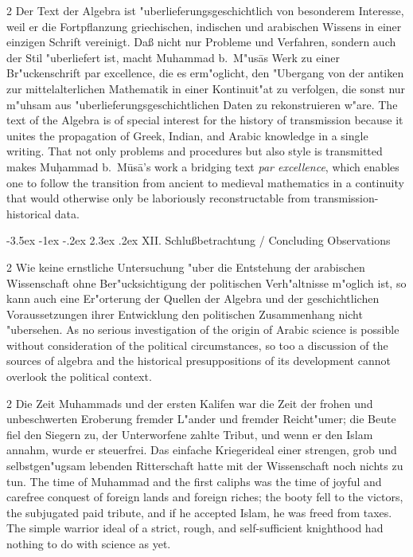 \documentclass[10pt,a4paper]{article}
\makeatletter
\renewcommand{\switchcolumn}{\syncronize\nointerlineskip\columnbreak}
\renewcommand{\section}{\@startsection{section}{1}{\z@}%
  {-3.5ex \@plus -1ex \@minus -.2ex}%
  {2.3ex \@plus .2ex}%
  {\normalfont\Large\bfseries\color{sectioncolor}}}
\makeatother
\begin{document}
\begin{paracol}{2}
Der Text der Algebra ist "uberlieferungsgeschichtlich von besonderem Interesse, weil er die Fortpflanzung griechischen, indischen und arabischen Wissens in einer einzigen Schrift vereinigt. Da\ss{} nicht nur Probleme und Verfahren, sondern auch der Stil "uberliefert ist, macht Muhammad b.\ M"us\=as Werk zu einer Br"uckenschrift par excellence, die es erm"oglicht, den "Ubergang von der antiken zur mittelalterlichen Mathematik in einer Kontinuit"at zu verfolgen, die sonst nur m"uhsam aus "uberlieferungsgeschichtlichen Daten zu rekonstruieren w"are.
\switchcolumn
The text of the Algebra is of special interest for the history of transmission because it unites the propagation of Greek, Indian, and Arabic knowledge in a single writing. That not only problems and procedures but also style is transmitted makes Mu\d{h}ammad b.\ M\=us\=a's work a bridging text \textit{par excellence}, which enables one to follow the transition from ancient to medieval mathematics in a continuity that would otherwise only be laboriously reconstructable from transmission-historical data.
\end{paracol}
\clearpage

\section{XII. Schlu\ss{}betrachtung / Concluding Observations}

\begin{paracol}{2}
Wie keine ernstliche Untersuchung "uber die Entstehung der arabischen Wissenschaft ohne Ber"ucksichtigung der politischen Verh"altnisse m"oglich ist, so kann auch eine Er"orterung der Quellen der Algebra und der geschichtlichen Voraussetzungen ihrer Entwicklung den politischen Zusammenhang nicht "ubersehen.
\switchcolumn
As no serious investigation of the origin of Arabic science is possible without consideration of the political circumstances, so too a discussion of the sources of algebra and the historical presuppositions of its development cannot overlook the political context.
\end{paracol}

\begin{paracol}{2}
Die Zeit Muhammads und der ersten Kalifen war die Zeit der frohen und unbeschwerten Eroberung fremder L"ander und fremder Reicht"umer; die Beute fiel den Siegern zu, der Unterworfene zahlte Tribut, und wenn er den Islam annahm, wurde er steuerfrei. Das einfache Kriegerideal einer strengen, grob und selbstgen"ugsam lebenden Ritterschaft hatte mit der Wissenschaft noch nichts zu tun.
\switchcolumn
The time of Muhammad and the first caliphs was the time of joyful and carefree conquest of foreign lands and foreign riches; the booty fell to the victors, the subjugated paid tribute, and if he accepted Islam, he was freed from taxes. The simple warrior ideal of a strict, rough, and self-sufficient knighthood had nothing to do with science as yet.
\end{paracol}
\end{document}
